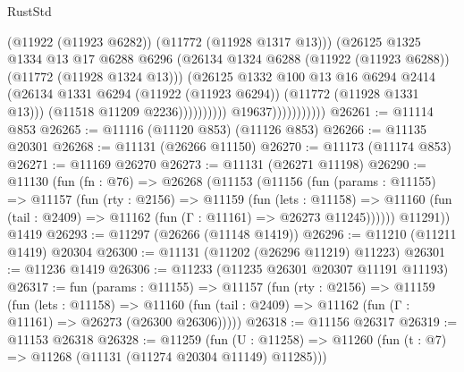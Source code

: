 \begin{lexlean}{RustStd}
\begin{coremodule}
                                          (@11922 (@11923 @6282))
                                          (@11772 (@11928 @1317 @13)))
                                        (@26125
                                          @1325
                                          @1334
                                          @13
                                          @17
                                          @6288
                                          @6296
                                          (@26134
                                            @1324
                                            @6288
                                            (@11922 (@11923 @6288))
                                            (@11772 (@11928 @1324 @13)))
                                          (@26125
                                            @1332
                                            @100
                                            @13
                                            @16
                                            @6294
                                            @2414
                                            (@26134
                                              @1331
                                              @6294
                                              (@11922 (@11923 @6294))
                                              (@11772 (@11928 @1331 @13)))
                                            (@11518 @11209 @2236))))))))))
                          @19637)))))))))))
@26261 := @11114 @853
@26265 := @11116 (@11120 @853) (@11126 @853)
@26266 := @11135 @20301
@26268 := @11131 (@26266 @11150)
@26270 := @11173 (@11174 @853)
@26271 := @11169 @26270
@26273 := @11131 (@26271 @11198)
@26290 := @11130
    (fun (fn : @76) =>
    @26268
      (@11153
        (@11156
          (fun (params : @11155) =>
          @11157
            (fun (rty : @2156) =>
            @11159
              (fun (lets : @11158) =>
              @11160 (fun (tail : @2409) => @11162 (fun (Γ : @11161) => @26273 @11245))))))
        @11291))
    @1419
@26293 := @11297 (@26266 (@11148 @1419))
@26296 := @11210 (@11211 @1419) @20304
@26300 := @11131 (@11202 (@26296 @11219) @11223)
@26301 := @11236 @1419
@26306 := @11233 (@11235 @26301 @20307 @11191 @11193)
@26317 := fun (params : @11155) =>
  @11157
    (fun (rty : @2156) =>
    @11159
      (fun (lets : @11158) =>
      @11160 (fun (tail : @2409) => @11162 (fun (Γ : @11161) => @26273 (@26300 @26306)))))
@26318 := @11156 @26317
@26319 := @11153 @26318
@26328 := @11259
    (fun (U : @11258) => @11260 (fun (t : @7) => @11268 (@11131 (@11274 @20304 @11149) @11285)))

\end{coremodule}
\end{lexlean}
